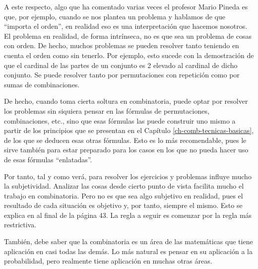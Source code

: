 A este respecto, algo que ha comentado varias veces el profesor Mario Pineda
es que, por ejemplo, cuando se nos plantea un problema y hablamos de que
``importa el orden'', en realidad eso es una interpretación que hacemos
nosotros. El problema en realidad, de forma intrínseca, no es que sea un
problema de cosas con orden. De hecho, muchos problemas se pueden resolver
tanto teniendo en cuenta el orden como sin tenerlo. Por ejemplo, esto sucede
con la demostración de que el cardinal de las partes de un conjunto es 2
elevado al cardinal de dicho conjunto. Se puede resolver tanto por
permutaciones con repetición como por sumas de combinaciones.

De hecho, cuando toma cierta soltura en combinatoria, puede optar por
resolver los problemas sin siquiera pensar en las fórmulas de permutaciones,
combinaciones, etc., sino que esas fórmulas las puede construir uno mismo a
partir de los principios que se presentan en el Capítulo
\ref{ch-comb-tecnicas-basicas}, de los que se deducen esas otras fórmulas.
Esto es lo más recomendable, pues le sirve también para estar preparado para
los casos en los que no pueda hacer uso de esas fórmulas ``enlatadas''.

Por tanto, tal y como verá, para resolver los ejercicios y problemas influye
mucho la subjetividad. Analizar las cosas desde cierto punto de vista
facilita mucho el trabajo en combinatoria. Pero no es que sea algo subjetivo
en realidad, pues el resultado de cada situación es objetivo y, por tanto,
siempre el mismo. Esto se explica en \cite{brualdi} al final de la página
43. La regla a seguir es comenzar por la regla más restrictiva.

También, debe saber que la combinatoria es un área de las matemáticas que
tiene aplicación en casi todas las demás. Lo más natural es pensar en su
aplicación a la probabilidad, pero realmente tiene aplicación en muchas
otras áreas.







